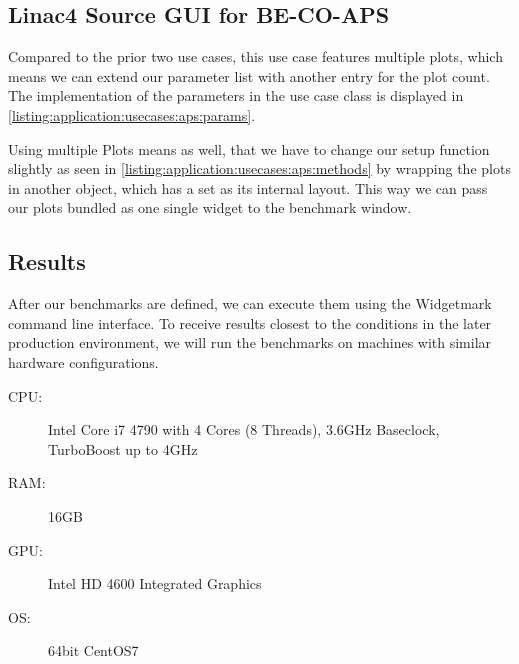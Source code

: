 

\subsection{Linac4 Source GUI for BE-CO-APS}

Compared to the prior two use cases, this use case features multiple plots,
which means we can extend our parameter list with another entry for the plot
count. The implementation of the parameters in the use case class is displayed
in \ref{listing:application:usecases:aps:params}.



Using multiple Plots means as well, that we have to change our setup function
slightly as seen in \ref{listing:application:usecases:aps:methods} by wrapping
the plots in another  object, which has a
 set as its internal layout. This way
we can pass our plots bundled as one single widget to the benchmark window.



\subsection{Results}

After our benchmarks are defined, we can execute them using the Widgetmark
command line interface. To receive results closest to the conditions in the
later production environment, we will run the benchmarks on machines with
similar hardware configurations.

\begin{description}

    \item[CPU:] Intel Core i7 4790 with 4 Cores (8 Threads),
                3.6GHz Baseclock,
                TurboBoost up to 4GHz

    \item[RAM:] 16GB

    \item[GPU:] Intel HD 4600 Integrated Graphics

    \item[OS:] 64bit CentOS7

\end{description}

